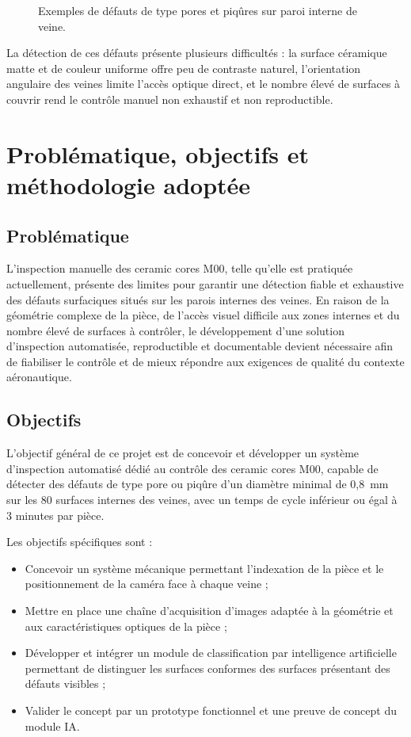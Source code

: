\begin{figure}[H]
\centering
{}
\caption{Exemples de défauts de type pores et piqûres sur paroi interne de veine.}
\label{fig:defauts_m00}
\end{figure}

La détection de ces défauts présente plusieurs difficultés : la surface céramique matte
et de couleur uniforme offre peu de contraste naturel, l'orientation angulaire des veines
limite l'accès optique direct, et le nombre élevé de surfaces à couvrir rend le contrôle
manuel non exhaustif et non reproductible.

\section{Problématique, objectifs et méthodologie adoptée}

\subsection*{Problématique}
L'inspection manuelle des ceramic cores M00, telle qu'elle est pratiquée actuellement,
présente des limites pour garantir une détection fiable et exhaustive des défauts
surfaciques situés sur les parois internes des veines. En raison de la géométrie complexe
de la pièce, de l'accès visuel difficile aux zones internes et du nombre élevé de surfaces
à contrôler, le développement d'une solution d'inspection automatisée, reproductible et
documentable devient nécessaire afin de fiabiliser le contrôle et de mieux répondre aux
exigences de qualité du contexte aéronautique.

\subsection*{Objectifs}
L'objectif général de ce projet est de concevoir et développer un système d'inspection
automatisé dédié au contrôle des ceramic cores M00, capable de détecter des défauts de
type pore ou piqûre d'un diamètre minimal de 0,8~mm sur les 80 surfaces internes des
veines, avec un temps de cycle inférieur ou égal à 3 minutes par pièce.

Les objectifs spécifiques sont :
\begin{itemize}
    \item Concevoir un système mécanique permettant l'indexation de la pièce et le
    positionnement de la caméra face à chaque veine ;
    \item Mettre en place une chaîne d'acquisition d'images adaptée à la géométrie et
    aux caractéristiques optiques de la pièce ;
    \item Développer et intégrer un module de classification par intelligence artificielle
    permettant de distinguer les surfaces conformes des surfaces présentant des défauts
    visibles ;
    \item Valider le concept par un prototype fonctionnel et une preuve de concept du
    module IA.
\end{itemize}


